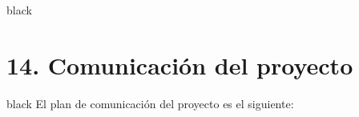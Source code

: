 \documentclass[11pt]{charter}
\providecommand{\DIFaddbegin}{} %
\providecommand{\DIFaddend}{} %
\providecommand{\DIFdelbegin}{} %
\providecommand{\DIFdelend}{} %
\begin{document}
\begin{consigna}{black}
\begin{itemize}
\begin{itemize}
\begin{itemize}
		\end{itemize}

	\end{itemize}

\end{itemize}

\DIFaddend \end{consigna}

\section{14. Comunicación del proyecto}
\label{sec:comunicaciones}

\DIFdelbegin %
\DIFdelend \DIFaddbegin \begin{consigna}{black}
\DIFaddend El plan de comunicación del proyecto es el siguiente:
\end{consigna}
\end{document}
